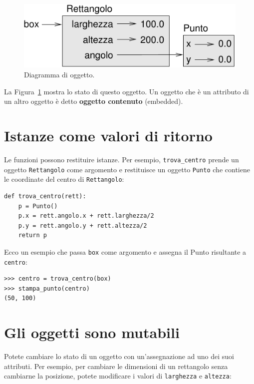 \documentclass[10pt]{book}
\begin{document}
\begin{figure}
\centerline
{\includegraphics[scale=0.8]{figs/rectangle.pdf}}
\caption{Diagramma di oggetto.}
\label{fig.rectangle}
\end{figure}


La Figura~\ref{fig.rectangle} mostra lo stato di questo oggetto.
Un oggetto che è un attributo di un altro oggetto è detto {\bf oggetto contenuto} (embedded).


\section{Istanze come valori di ritorno}

Le funzioni possono restituire istanze. Per esempio, \verb"trova_centro"
prende un oggetto {\tt Rettangolo} come argomento e restituisce un oggetto {\tt Punto} che contiene le coordinate del centro di {\tt Rettangolo}:

\begin{verbatim}
def trova_centro(rett):
    p = Punto()
    p.x = rett.angolo.x + rett.larghezza/2
    p.y = rett.angolo.y + rett.altezza/2
    return p
\end{verbatim}
%
Ecco un esempio che passa {\tt box} come argomento e assegna il Punto risultante a {\tt centro}:

\begin{verbatim}
>>> centro = trova_centro(box)
>>> stampa_punto(centro)
(50, 100)
\end{verbatim}
%

\section{Gli oggetti sono mutabili}

Potete cambiare lo stato di un oggetto con un'assegnazione ad uno dei suoi attributi. Per esempio, per cambiare le dimensioni di un rettangolo senza cambiarne la posizione, potete modificare i valori di {\tt larghezza} e {\tt altezza}:
\end{document}
